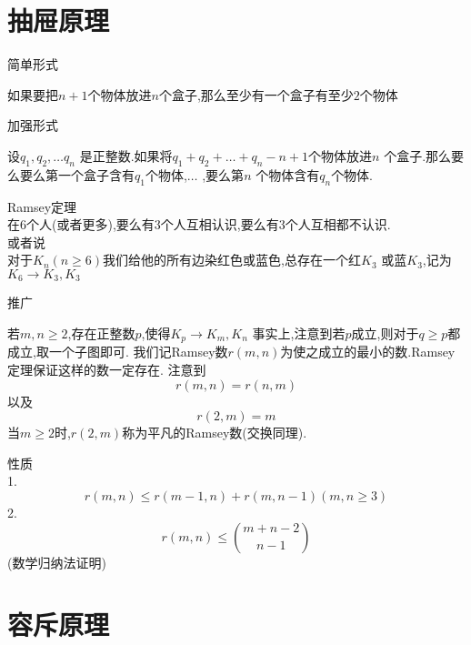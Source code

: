 \section{抽屉原理}
简单形式
\begin{proposition}
如果要把$n+1$个物体放进$n$个盒子,那么至少有一个盒子有至少$2$个物体
\end{proposition}
加强形式

\begin{proposition}
设$q_1,q_2,\dots q_n$ 是正整数.如果将$q_1+q_2+\dots +q_n-n+1$个物体放进$n$ 个盒子.那么要么要么第一个盒子含有$q_1$个物体,$\dots$ ,要么第$n$ 个物体含有$q_n$个物体.
\end{proposition}

\begin{theorem}
Ramsey定理\\
在$6$个人(或者更多),要么有$3$个人互相认识,要么有$3$个人互相都不认识.\\
或者说\\
对于$K_n(n \geq 6)$我们给他的所有边染红色或蓝色,总存在一个红$K_3$ 或蓝$K_3$,记为$K_6\rightarrow K_3,K_3$
\end{theorem}

推广 
\begin{theorem}
若$m,n \geq2 $,存在正整数$p$,使得$K_p\rightarrow K_m,K_n $
事实上,注意到若$p$成立,则对于$q\geq p$都成立,取一个子图即可.
我们记Ramsey数$r(m,n)$为使之成立的最小的数.Ramsey定理保证这样的数一定存在.
注意到$$r(m,n)=r(n,m)$$
以及$$r(2,m)=m $$ 当$m\geq2$时,$r(2,m)$称为平凡的Ramsey数(交换同理).
\end{theorem}

性质\\
1. $$r(m,n)\leq r(m-1,n)+r(m,n-1)(m,n \geq 3) $$
2. $$r(m,n)\leq \binom{m+n-2}{n-1} $$(数学归纳法证明)

\section{容斥原理}
